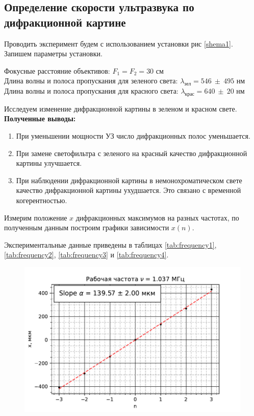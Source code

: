 	\subsection*{Определение скорости ультразвука по дифракционной картине}
	
	Проводить эксперимент будем с использованием установки рис \ref{shema1}. Запишем параметры установки.
	
	\begin{center}
		Фокусные расстояние объективов: $F_1 = F_2 = 30$ см\\
		Длина волны и полоса пропускания для зеленого света: $\lambda_{\text{зел}} = 546 ~ \pm ~ 495$ нм \\
		Длина волны и полоса пропускания для красного света: $\lambda_{\text{крас}} = 640 ~ \pm ~ 20$ нм \\
	\end{center}

	Исследуем изменение дифракционной картины в зеленом и красном свете. \textbf{Полученные выводы:} 
	
	\begin{enumerate}
		\item При уменьшении мощности УЗ число дифракционных полос уменьшается.
		\item При замене светофильтра с зеленого на красный качество дифракционной картины улучшается.
		\item При наблюдении дифракционной картины в немонохроматическом свете качество дифракционной картины ухудшается. Это связано с временной когерентностью.
	\end{enumerate}

	Измерим положение $x$ дифракционных максимумов на разных частотах, по полученным данным построим графики зависимости $x(n)$. 
	
	Экспериментальные данные приведены в таблицах \ref{tab:frequency1}, \ref{tab:frequency2}, \ref{tab:frequency3} и \ref{tab:frequency4}.
	
	
	
	\begin{figure}
		\centering
		\includegraphics[scale=1]{./images/frequency1.ods.pdf}
		\label{fig:frequency1}
	\end{figure}
	
